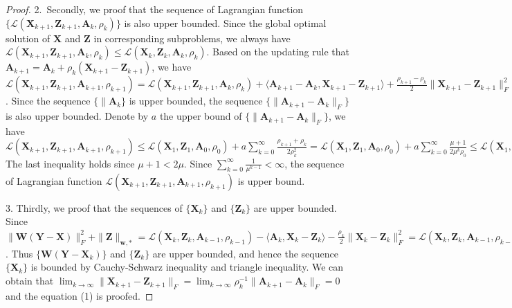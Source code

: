\documentclass[10pt,twocolumn,letterpaper,sort&compress]{article}
\begin{document}
\begin{proof}
2.\ Secondly, we proof that the sequence of Lagrangian function $\{\mathcal{L}(\mathbf{X}_{k+1},\mathbf{Z}_{k+1},\mathbf{A}_{k},\rho_{k})\}$ is also upper bounded. Since the global optimal solution of $\mathbf{X}$ and $\mathbf{Z}$ in corresponding subproblems, we always have 
$
\mathcal{L}(\mathbf{X}_{k+1},\mathbf{Z}_{k+1},\mathbf{A}_{k},\rho_{k})
\le
\mathcal{L}(\mathbf{X}_{k},\mathbf{Z}_{k},\mathbf{A}_{k},\rho_{k}).
$
Based on the updating rule that 
$
\mathbf{A}_{k+1}
=
\mathbf{A}_{k} + \rho_{k}(\mathbf{X}_{k+1}-\mathbf{Z}_{k+1})
$,
we have 
$
\mathcal{L}(\mathbf{X}_{k+1},\mathbf{Z}_{k+1},\mathbf{A}_{k+1},\rho_{k+1})
=
\mathcal{L}(\mathbf{X}_{k+1},\mathbf{Z}_{k+1},\mathbf{A}_{k},\rho_{k})
+
\langle
\mathbf{A}_{k+1}
-
\mathbf{A}_{k}
,
\mathbf{X}_{k+1}
-
\mathbf{Z}_{k+1}
\rangle
+
\frac{\rho_{k+1}-\rho_{k}}{2}
\|
\mathbf{X}_{k+1}-\mathbf{Z}_{k+1}
\|_{F}^{2}
=
\mathcal{L}(\mathbf{X}_{k+1},\mathbf{Z}_{k+1},\mathbf{A}_{k},\rho_{k})
+
\frac{\rho_{k+1}+\rho_{k}}{2\rho_{k}^{2}}
\|
\mathbf{A}_{k+1}
-
\mathbf{A}_{k}
\|_{F}^{2}
$.
Since the sequence 
$\{\|
\mathbf{A}_{k}\}$
is upper bounded, the sequence 
$\{\|
\mathbf{A}_{k+1}
-
\mathbf{A}_{k}
\|_{F}\}$ is also upper bounded. Denote by $a$ the upper bound of 
$\{\|
\mathbf{A}_{k+1}
-
\mathbf{A}_{k}
\|_{F}\}$, 
we have 
$
\mathcal{L}(\mathbf{X}_{k+1},\mathbf{Z}_{k+1},\mathbf{A}_{k+1},\rho_{k+1})
\le
\mathcal{L}(\mathbf{X}_{1},\mathbf{Z}_{1},\mathbf{A}_{0},\rho_{0})
+
a\sum_{k=0}^{\infty}\frac{\rho_{k+1}+\rho_{k}}{2\rho_{k}^{2}}
=
\mathcal{L}(\mathbf{X}_{1},\mathbf{Z}_{1},\mathbf{A}_{0},\rho_{0})
+
a\sum_{k=0}^{\infty}\frac{\mu+1}{2\mu^{k}\rho_{0}}
\le
\mathcal{L}(\mathbf{X}_{1},\mathbf{Z}_{1},\mathbf{A}_{0},\rho_{0})
+
\frac{a}{\rho_{0}}\sum_{k=0}^{\infty}\frac{1}{\mu^{k-1}}.
$
The last inequality holds since $\mu+1<2\mu$. Since $\sum_{k=0}^{\infty}\frac{1}{\mu^{k-1}}<\infty$, the sequence of Lagrangian function 
$\mathcal{L}(\mathbf{X}_{k+1},\mathbf{Z}_{k+1},\mathbf{A}_{k+1},\rho_{k+1})$
is upper bound.

3. Thirdly, we proof that the sequences of 
$\{\mathbf{X}_{k}\}$ and $\{\mathbf{Z}_{k}\}$ are upper bounded. Since 
$\|\mathbf{W}(\mathbf{Y}-\mathbf{X})\|_{F}^{2}
+
\|\mathbf{Z}\|_{\bm{w},*}
=
\mathcal{L}(\mathbf{X}_{k},\mathbf{Z}_{k},\mathbf{A}_{k-1},\rho_{k-1})
-
\langle
\mathbf{A}_{k},
\mathbf{X}_{k}-\mathbf{Z}_{k}
\rangle
-
\frac{\rho_{k}}{2}
\|
\mathbf{X}_{k}-\mathbf{Z}_{k}
\|_{F}^{2}
=
\mathcal{L}(\mathbf{X}_{k},\mathbf{Z}_{k},\mathbf{A}_{k-1},\rho_{k-1})
+
\frac{1}{2\rho_{k}}
(
\|
\mathbf{A}_{k-1}
\|_{F}^{2}
-
\|
\mathbf{A}_{k}
\|_{F}^{2}
)
$.
Thus $\{\mathbf{W}(\mathbf{Y}-\mathbf{X}_{k})\}$ and $\{\mathbf{Z}_{k}\}$ are upper bounded, and hence
the sequence $\{\mathbf{X}_{k}\}$ is bounded by Cauchy-Schwarz inequality and triangle inequality.
We can obtain that 
$
\lim_{k \to \infty} 
\|\mathbf{X}_{k+1}-\mathbf{Z}_{k+1}\|_{F}
=
\lim_{k \to \infty} 
\rho_{k}^{-1}
\|
\mathbf{A}_{k+1}
-
\mathbf{A}_{k}
\|_{F}
=
0
$ and the equation (1) is proofed.


\end{proof}
\end{document}
